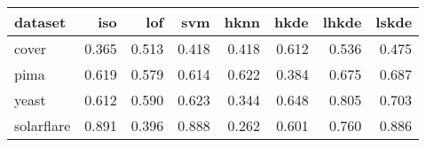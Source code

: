 \begin{tabular}{l|rrr|rrrr}
  \toprule
dataset & iso & lof & svm & hknn & hkde & lhkde & lskde \\ 
  \midrule
cover & 0.365 & 0.513 & 0.418 & 0.418 & 0.612 & 0.536 & 0.475 \\ 
  pima & 0.619 & 0.579 & 0.614 & 0.622 & 0.384 & 0.675 & 0.687 \\ 
  yeast & 0.612 & 0.590 & 0.623 & 0.344 & 0.648 & 0.805 & 0.703 \\ 
  solarflare & 0.891 & 0.396 & 0.888 & 0.262 & 0.601 & 0.760 & 0.886 \\ 
   \bottomrule
\end{tabular}
